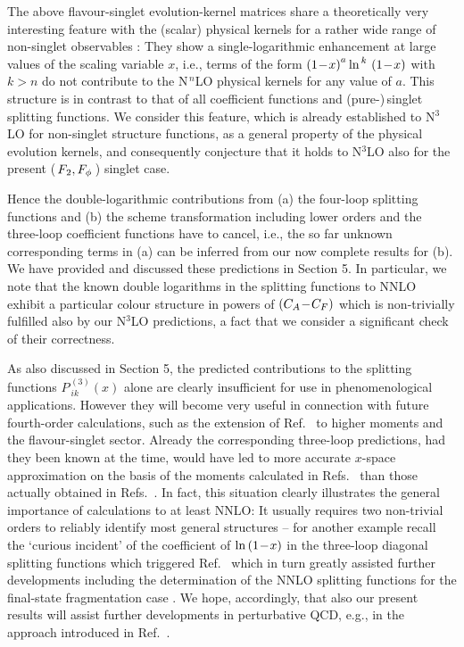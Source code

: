 \documentclass[12pt]{article}
\begin{document}
The above flavour-singlet evolution-kernel matrices share 
a theoretically very interesting feature with the (scalar) physical kernels for
a rather wide range of non-singlet observables \cite{MV3,MV5}: They show a
single-logarithmic enhancement at large values of the scaling variable $x$, 
i.e., terms of the form $\x1^a \ln^{\,k}\, \x1$ with $k > n$ do not contribute
to the N$^{\,n}$LO physical kernels for any value of $a$. This structure is in 
contrast to that of all coefficient functions and (pure-)$\,$singlet splitting 
functions. We consider this feature, which is already established to N$^3$LO 
for non-singlet structure functions, as a general property of the physical 
evolution kernels, and consequently conjecture that it holds to N$^3$LO also 
for the present ($\,{F_{\:\! 2}}, F_\phi\,$) singlet case.

Hence the double-logarithmic contributions from (a) the four-loop splitting 
functions and (b) the scheme transformation including lower orders and the 
three-loop coefficient functions have to cancel, i.e., the so far unknown 
corresponding terms in (a) can be inferred from our now complete results for 
(b). We have provided and discussed these predictions in Section 5. 
In particular, we note that the known double logarithms in the splitting 
functions to NNLO exhibit a particular colour structure in powers of 
$({C_A} \!-\! {C_F})$ which is non-trivially fulfilled also by our N$^3$LO 
predictions, a fact that we consider a significant check of their correctness.

As also discussed in Section 5, the predicted contributions to the splitting
functions $P_{\:\!ik}^{\,(3)}(x)$ alone are clearly insufficient for use in 
phenomenological applications. However they will become very useful in 
connection with future fourth-order calculations, such as the extension of
Ref.~\cite{Baikov:2006ch} to higher moments and the flavour-singlet sector. 
Already the corresponding three-loop predictions, had they been known at the
time, would have led to more accurate $x$-space approximation on the basis of
the moments calculated in Refs.~\cite{Mom3loop} than those actually obtained in 
Refs.~\cite{NV2,NV4}. In fact, this situation clearly illustrates the general
importance of calculations to at least NNLO: 
It usually requires two non-trivial orders to reliably identify most general 
structures -- for another example recall the `curious incident' of the 
coefficient of $\ln \x1$ in the three-loop diagonal splitting functions 
\cite{MVV3,MVV4} which triggered Ref.~\cite{DMS05} which in turn greatly 
assisted further developments including the determination of the NNLO splitting
functions for the final-state fragmentation case \cite{Mitov:2006ic,MV2}. 
We hope, accordingly, that also our present results will assist further 
developments in perturbative QCD, e.g., in the approach introduced in 
Ref.~\cite{Laenen:2008gt}.
\end{document}
